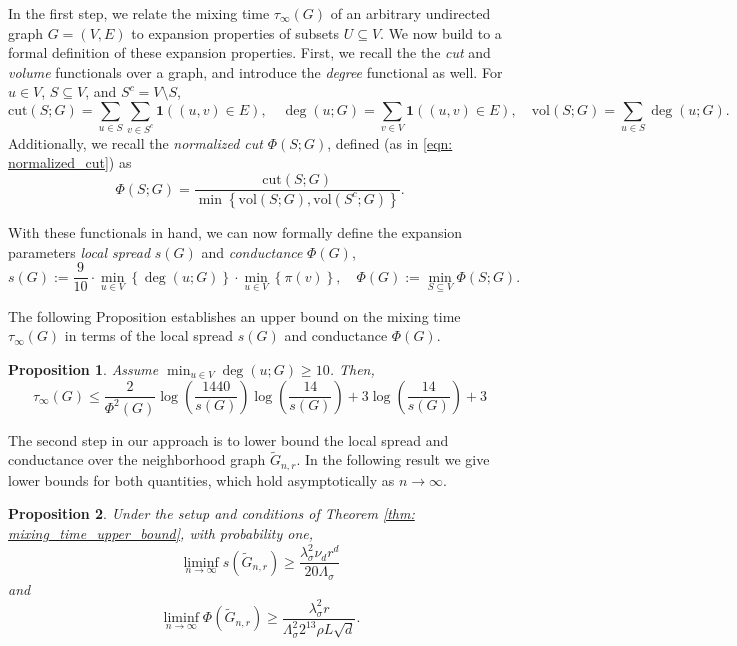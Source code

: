 \documentclass[11pt,twoside]{article}
\newtheorem{proposition}{Proposition}
\newcommand{\set}[1]{\left\{#1\right\}}
\newcommand{\vol}{\mathrm{vol}}
\newcommand{\cut}{\mathrm{cut}}
\newcommand{\1}{\mathbf{1}}
\begin{document}
In the first step, we relate the mixing time $\tau_{\infty}(G)$ of an arbitrary undirected graph $G = (V,E)$ to expansion properties of subsets $U \subseteq V$. We now build to a formal definition of these expansion properties. First, we recall the the \emph{cut} and \emph{volume} functionals over a graph, and introduce the \emph{degree} functional as well. For $u \in V$, $S \subseteq V$, and $S^c = V \setminus S$,
\begin{equation*}
\cut(S;G) = \sum_{u \in S} \sum_{v \in S^c} \1((u,v) \in E), \quad \deg(u;G) = \sum_{v \in V} \1((u,v) \in E), \quad \vol(S;G) = \sum_{u \in S} \deg(u;G).
\end{equation*}
Additionally, we recall the \emph{normalized cut} $\Phi(S;G)$, defined (as in \eqref{eqn: normalized_cut}) as
\begin{equation*}
\Phi(S;G) = \frac{\cut(S; G)}{\min\set{\vol(S; G),\vol(S^c; G)}}.
\end{equation*}

With these functionals in hand, we can now formally define the expansion parameters \emph{local spread} $s(G)$ and \emph{conductance} $\Phi(G)$,
\begin{equation*}
s(G) := \frac{9}{10} \cdot \min_{u \in V} \set{\deg(u; G)} \cdot \min_{u \in V} \set{\pi(v)}, \quad \Phi(G) := \min_{S \subseteq V} \Phi(S;G).
\end{equation*}

The following Proposition establishes an upper bound on the mixing time $\tau_{\infty}(G)$ in terms of the local spread $s(G)$ and conductance $\Phi(G)$.
\begin{proposition}
	\label{prop: pointwise_mixing_time}
	Assume $\min_{u \in V} \deg(u; G) \geq 10$. Then,
	\begin{equation*}
	\tau_{\infty}(G) \leq \frac{2}{\Phi^2(G)} \log \left(\frac{1440}{s(G)}\right)\log \left(\frac{14}{s(G)}\right)  + 3 \log \left(\frac{14}{s(G)}\right) + 3
	\end{equation*}
\end{proposition}

The second step in our approach is to lower bound the local spread and conductance over the neighborhood graph $\widetilde{G}_{n,r}$. In the following result we give lower bounds for both quantities, which hold asymptotically as $n \to \infty$.
\begin{proposition}
	\label{prop: local_spread_conductance}
	Under the setup and conditions of Theorem \ref{thm: mixing_time_upper_bound}, with probability one,
	\begin{equation}
	\label{eqn: local_spread}
	\liminf_{n \to \infty} s(\widetilde{G}_{n,r}) \geq \frac{\lambda_{\sigma}^2 \nu_d r^d}{20\Lambda_{\sigma}} 
	\end{equation}
	and
	\begin{equation}
	\label{eqn: conductance}
	\liminf_{n \to \infty} \Phi(\widetilde{G}_{n,r}) \geq \frac{\lambda_{\sigma}^2 r}{\Lambda_{\sigma}^2 2^{13} \rho L \sqrt{d}}.
	\end{equation}
\end{proposition}
\end{document}
